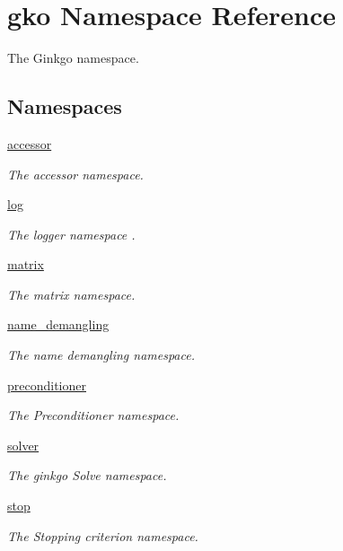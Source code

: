\hypertarget{namespacegko}{}\section{gko Namespace Reference}
\label{namespacegko}


The Ginkgo namespace.  


\subsection*{Namespaces}
\begin{DoxyCompactItemize}
\item 
 \hyperlink{namespacegko_1_1accessor}{accessor}
\begin{DoxyCompactList}\small\item\em The accessor namespace. \end{DoxyCompactList}\item 
 \hyperlink{namespacegko_1_1log}{log}
\begin{DoxyCompactList}\small\item\em The logger namespace . \end{DoxyCompactList}\item 
 \hyperlink{namespacegko_1_1matrix}{matrix}
\begin{DoxyCompactList}\small\item\em The matrix namespace. \end{DoxyCompactList}\item 
 \hyperlink{namespacegko_1_1name__demangling}{name\+\_\+demangling}
\begin{DoxyCompactList}\small\item\em The name demangling namespace. \end{DoxyCompactList}\item 
 \hyperlink{namespacegko_1_1preconditioner}{preconditioner}
\begin{DoxyCompactList}\small\item\em The Preconditioner namespace. \end{DoxyCompactList}\item 
 \hyperlink{namespacegko_1_1solver}{solver}
\begin{DoxyCompactList}\small\item\em The ginkgo Solve namespace. \end{DoxyCompactList}\item 
 \hyperlink{namespacegko_1_1stop}{stop}
\begin{DoxyCompactList}\small\item\em The Stopping criterion namespace. \end{DoxyCompactList}\item 

\end{DoxyCompactItemize}
